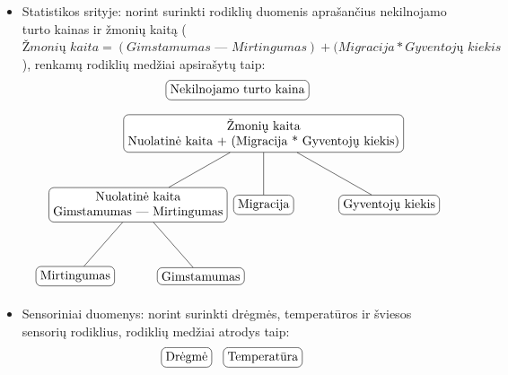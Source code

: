 \documentclass{VUMIFPSbakalaurinis}
\begin{document}
\begin{itemize}
    \item Statistikos srityje: norint surinkti rodiklių duomenis aprašančius nekilnojamo turto kainas ir žmonių kaitą (\(\textit{Žmonių kaita} = (\textit{Gimstamumas — Mirtingumas}) + (\textit{Migracija} * \textit{Gyventojų kiekis}\)), renkamų rodiklių medžiai apsirašytų taip: 
    \[	
        \begin{tikzpicture}[sibling distance=7em, every node/.style = {shape=rectangle, rounded                                corners, draw, align=center,	
            top color=white, bottom color=white}]	
            \node{Nekilnojamo turto kaina};
        \end{tikzpicture} 
    \]
    \[
        \begin{tikzpicture}[sibling distance=10em,
            level distance=2cm,
            every node/.style = {shape=rectangle, rounded corners,	
                                 draw, align=center,	
                                 top color=white, bottom color=white}]	
            \node{Žmonių kaita\\Nuolatinė kaita + (Migracija * Gyventojų kiekis)}
                    child { node {Nuolatinė kaita\\Gimstamumas — Mirtingumas} 
                            child {node {Mirtingumas}}
                            child {node {Gimstamumas}} }	
                    child { node {Migracija} } 	
                    child { node {Gyventojų kiekis} }; 	
        \end{tikzpicture} 	
    \]
    \item Sensoriniai duomenys: norint surinkti drėgmės, temperatūros ir šviesos sensorių rodiklius, rodiklių medžiai atrodys taip:
    \[	
        \begin{tikzpicture}[sibling distance=7em,  every node/.style = {shape=rectangle,  
                                rounded corners, draw, align=center,	
                                top color=white, bottom color=white}]	
            \node{Drėgmė};
        \end{tikzpicture}\>\>\>\>
        \begin{tikzpicture}[sibling distance=7em, every node/.style = {shape=rectangle, 
                                rounded corners, draw, align=center,	
                                top color=white, bottom color=white}]	
            \node{Temperatūra};
        \end{tikzpicture}\>\>\>\>
        \begin{tikzpicture}[sibling distance=7em, every node/.style = {shape=rectangle, rounded                                corners, draw, align=center,	
                                top color=white, bottom color=white}]	

\end{tikzpicture}\]
\end{itemize}
\end{document}
